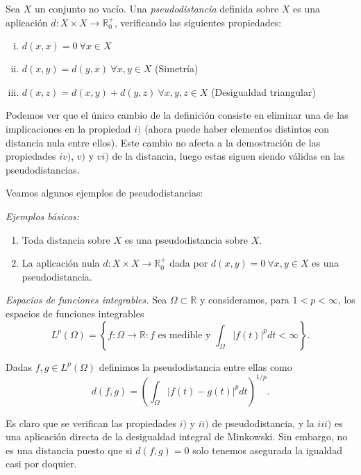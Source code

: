 \documentclass[ oneside,openany,titlepage,numbers=noenddot,headinclude,%
                footinclude=true,cleardoublepage=empty,abstractoff, %
                BCOR=5mm,paper=a4,fontsize=11pt,%
                spanish,american%
                ]{scrreprt}
\begin{document}
\begin{definition}[Distancia]
	Sea $X$ un conjunto no vacío. Una \emph{pseudodistancia} definida sobre $X$ es una aplicación $d:X\times X \to \mathbb{R}^{+}_{0}$, verificando las siguientes propiedades:
	
	\begin{enumerate}[i)]
		\item $d(x,x)=0  \ \forall x \in X$ 
		\item $d(x,y)=d(y,x) \ \forall x,y \in X$ (Simetría) 
		\item $d(x,z)=d(x,y)+d(y,z) \ \forall x,y,z \in X$ (Desigualdad triangular) 
	\end{enumerate}
	
\end{definition}

\remb

Podemos ver que el único cambio de la definición consiste en eliminar una de las implicaciones en la propiedad $i)$ (ahora puede haber elementos distintos con distancia nula entre ellos). Este cambio no afecta a la demostración de las propiedades $iv)$, $v)$ y $vi)$ de la distancia, luego estas siguen siendo válidas en las pseudodistancias.

\reme

Veamos algunos ejemplos de pseudodistancias:

\exampleb

\emph{Ejemplos básicos:}

\begin{enumerate}[1]
	\item Toda distancia sobre $X$ es una pseudodistancia sobre $X$.
	\item La aplicación nula $d:X\times X \to \mathbb{R}^+_0$ dada por $d(x,y) = 0 \ \forall x,y \in X$ es una pseudodistancia.
	
\end{enumerate}

\examplee

\exampleb

\emph{Espacios de funciones integrables.} Sea $\Omega \subset \mathbb{R}$ y consideramos, para $1 < p < \infty$, los espacios de funciones integrables 
\[L^p(\Omega)=\left\{f:\Omega \to \mathbb{R} : f \text{ es medible y } \int_{\Omega} |f(t)|^p dt < \infty \right\}.\]

Dadas $f,g \in L^p(\Omega)$ definimos la pseudodistancia entre ellas como \[d(f,g)=\left(\int_{\Omega}|f(t)-g(t)|^p dt\right)^{1/p}.\]

Es claro que se verifican las propiedades $i)$ y $ii)$ de pseudodistancia, y la $iii)$ es una aplicación directa de la desigualdad integral de Minkowski. Sin embargo, no es una distancia puesto que si $d(f,g)=0$ solo tenemos asegurada la igualdad casi por doquier.
\end{document}
